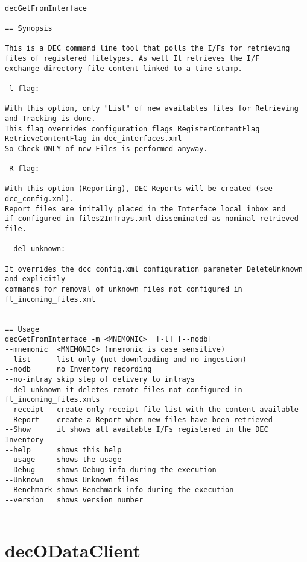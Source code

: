 \documentclass[dec_sum_main.tex]{subfiles}
\begin{document}
\begin{verbatim}

decGetFromInterface 

== Synopsis

This is a DEC command line tool that polls the I/Fs for retrieving 
files of registered filetypes. As well It retrieves the I/F 
exchange directory file content linked to a time-stamp.

-l flag:

With this option, only "List" of new availables files for Retrieving and Tracking is done.
This flag overrides configuration flags RegisterContentFlag RetrieveContentFlag in dec_interfaces.xml
So Check ONLY of new Files is performed anyway.

-R flag:

With this option (Reporting), DEC Reports will be created (see dcc_config.xml). 
Report files are initally placed in the Interface local inbox and
if configured in files2InTrays.xml disseminated as nominal retrieved file.

--del-unknown:

It overrides the dcc_config.xml configuration parameter DeleteUnknown and explicitly
commands for removal of unknown files not configured in ft_incoming_files.xml


== Usage
decGetFromInterface -m <MNEMONIC>  [-l] [--nodb]
--mnemonic  <MNEMONIC> (mnemonic is case sensitive)
--list      list only (not downloading and no ingestion)
--nodb      no Inventory recording
--no-intray skip step of delivery to intrays
--del-unknown it deletes remote files not configured in ft_incoming_files.xmls
--receipt   create only receipt file-list with the content available
--Report    create a Report when new files have been retrieved
--Show      it shows all available I/Fs registered in the DEC Inventory
--help      shows this help
--usage     shows the usage
--Debug     shows Debug info during the execution
--Unknown   shows Unknown files
--Benchmark shows Benchmark info during the execution
--version   shows version number


\end{verbatim}


\section{decODataClient}
\label{decODataClient}
\end{document}
